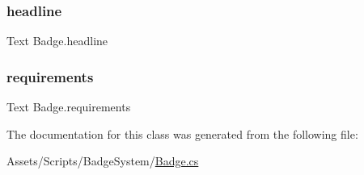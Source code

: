 \mbox{\label{classBadge_af8bd5a9e7c02e0104e6de94a66ccdfd6}} 
\subsubsection{\texorpdfstring{headline}{headline}}
{\footnotesize\ttfamily Text Badge.\+headline}

\mbox{\label{classBadge_a2f25bf37b462f6420daf0e140007f824}} 
\subsubsection{\texorpdfstring{requirements}{requirements}}
{\footnotesize\ttfamily Text Badge.\+requirements}



The documentation for this class was generated from the following file\+:\begin{DoxyCompactItemize}
\item 
Assets/\+Scripts/\+Badge\+System/\hyperlink{Badge_8cs}{Badge.\+cs}\end{DoxyCompactItemize}
